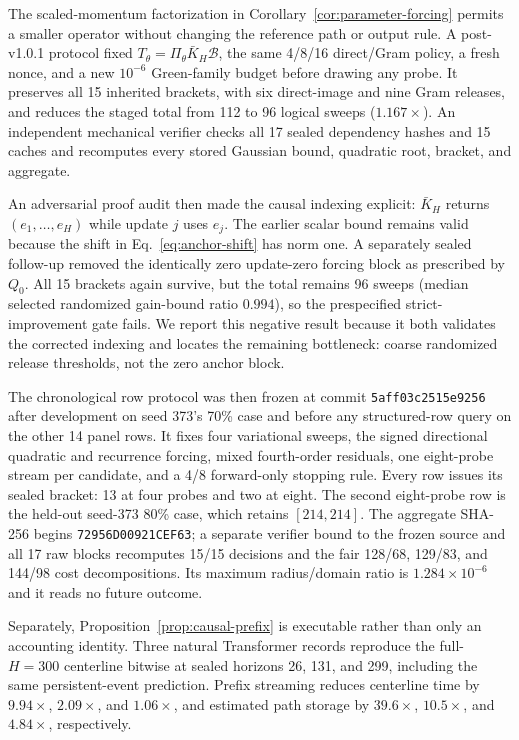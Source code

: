 \documentclass{article}
\begin{document}
The scaled-momentum factorization in
Corollary~\ref{cor:parameter-forcing} permits a smaller operator without
changing the reference path or output rule.  A post-v1.0.1 protocol fixed
$T_\theta=\Pi_\theta\bar K_H\mathcal B$, the same 4/8/16 direct/Gram policy,
a fresh nonce, and a new $10^{-6}$ Green-family budget before drawing any
probe.  It preserves all 15 inherited brackets, with six direct-image and nine
Gram releases, and reduces the staged total from 112 to 96 logical sweeps
($1.167\times$).  An independent mechanical verifier checks all 17 sealed
dependency hashes and 15 caches and recomputes every stored Gaussian bound,
quadratic root, bracket, and aggregate.

An adversarial proof audit then made the causal indexing explicit:
$\bar K_H$ returns $(e_1,\ldots,e_H)$ while update $j$ uses $e_j$.  The
earlier scalar bound remains valid because the shift in
Eq.~\eqref{eq:anchor-shift} has norm one.  A separately sealed follow-up
removed the identically zero update-zero forcing block as prescribed by
$Q_0$.  All 15 brackets again survive, but the total remains 96 sweeps (median
selected randomized gain-bound ratio $0.994$), so the prespecified
strict-improvement gate fails.  We report this negative result because it both
validates the corrected indexing and locates the remaining bottleneck: coarse
randomized release thresholds, not the zero anchor block.

The chronological row protocol was then frozen at commit
\texttt{5aff03c2515e9256} after development on seed 373's 70\% case and before
any structured-row query on the other 14 panel rows.  It fixes four variational
sweeps, the signed directional quadratic and recurrence forcing, mixed
fourth-order residuals, one eight-probe stream per candidate, and a 4/8
forward-only stopping rule.  Every row issues its sealed bracket: 13 at four
probes and two at eight.  The second eight-probe row is the held-out seed-373
80\% case, which retains $[214,214]$.  The aggregate SHA-256 begins
\texttt{72956D00921CEF63}; a separate verifier bound to the frozen source and
all 17 raw blocks recomputes 15/15 decisions and the fair 128/68, 129/83, and
144/98 cost decompositions.  Its maximum radius/domain ratio is
$1.284\times10^{-6}$ and it reads no future outcome.

Separately, Proposition~\ref{prop:causal-prefix} is executable rather than only
an accounting identity.  Three natural Transformer records reproduce the
full-$H=300$ centerline bitwise at sealed horizons 26, 131, and 299, including
the same persistent-event prediction.  Prefix streaming reduces centerline
time by $9.94\times$, $2.09\times$, and $1.06\times$, and estimated path
storage by $39.6\times$, $10.5\times$, and $4.84\times$, respectively.
\end{document}
